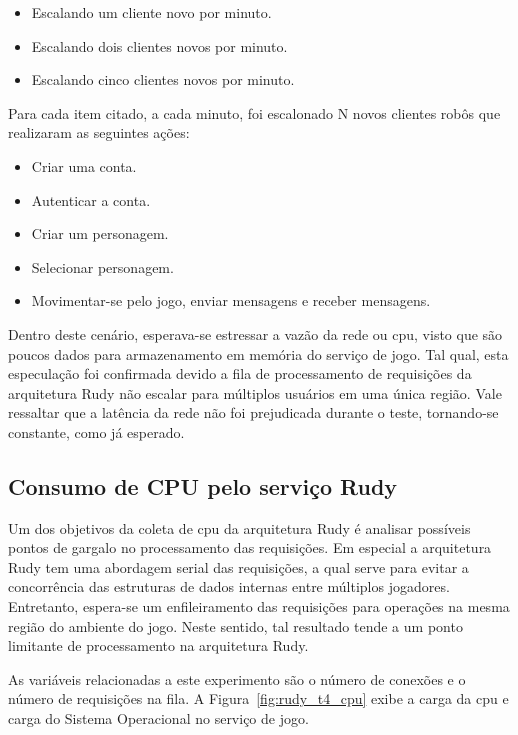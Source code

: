 \begin{itemize}
 \item Escalando um cliente novo por minuto.
 \item Escalando dois clientes novos por minuto.
 \item Escalando cinco clientes novos por minuto.
\end{itemize}

Para cada item citado, a cada minuto, foi escalonado N novos clientes robôs que realizaram as seguintes ações:

\begin{itemize}
 \item Criar uma conta.
 \item Autenticar a conta.
 \item Criar um personagem.
 \item Selecionar personagem.
 \item Movimentar-se pelo jogo, enviar mensagens e receber mensagens.
\end{itemize}

Dentro deste cenário, esperava-se estressar a vazão da rede ou \ac{cpu}, visto que são poucos dados para armazenamento em memória do serviço de jogo.
%
Tal qual, esta especulação foi confirmada devido a fila de processamento de requisições da arquitetura Rudy não escalar para múltiplos usuários em uma única região.
%
Vale ressaltar que a latência da rede não foi prejudicada durante o teste, tornando-se constante, como já esperado.


\subsection{Consumo de CPU pelo serviço Rudy}

Um dos objetivos da coleta de \ac{cpu} da arquitetura Rudy é analisar possíveis pontos de gargalo no processamento das requisições.
%
Em especial a arquitetura Rudy tem uma abordagem serial das requisições, a qual serve para evitar a concorrência das estruturas de dados internas entre múltiplos jogadores.
%
Entretanto, espera-se um enfileiramento das requisições para operações na mesma região do ambiente do jogo.
%
Neste sentido, tal resultado tende a um ponto limitante de processamento na arquitetura Rudy.

As variáveis relacionadas a este experimento são o número de conexões e o número de requisições na fila.
%
A Figura~\ref{fig:rudy_t4_cpu} exibe a carga da \ac{cpu} e carga do Sistema Operacional no serviço de jogo.


